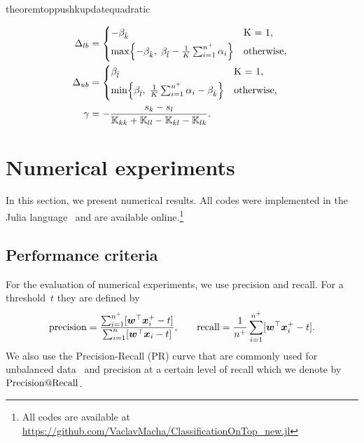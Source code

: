 \begin{restatable}{theorem}{toppushkupdatequadratic}
\begin{itemize}
    \begin{align*}
      \Delta_{lb} & = 
        \begin{cases*}
          -\beta_{\hat k} & K = 1, \\
          \max \Brac[c]{- \beta_{\hat k},\; \beta_{\hat l} - \frac{1}{K} \sum_{i = 1}^{n^+} \alpha_i} & \textrm{otherwise},
        \end{cases*} \\
      \Delta_{ub} & = 
        \begin{cases*}
          \beta_{\hat l} & K = 1, \\
          \min \Brac[c]{\beta_{\hat l},\; \frac{1}{K} \sum_{i = 1}^{n^+} \alpha_i - \beta_{\hat k}} & \textrm{otherwise},
        \end{cases*} \\
      \gamma & = -\frac{s_k - s_l}{\K_{kk} + \K_{ll} - \K_{kl} - \K_{lk}}.
    \end{align*}
  \end{itemize}
\end{restatable}

\section{Numerical experiments}\label{sec:Numerical experiments}

In this section, we present numerical results. All codes were implemented in the Julia language~\cite{bezanson2017julia} and are available online.\footnote{All codes are available at \url{https://github.com/VaclavMacha/ClassificationOnTop_new.jl}}

\subsection{Performance criteria}

For the evaluation of numerical experiments, we use precision and recall. For a threshold~$t$ they are defined by
\begin{equation}\label{eq:prec_rec}
  \begin{alignedat}{2}
      \operatorname{precision}
      & = \frac{\sum_{i = 1}^{n^+} [\bm{w}^{\top}\bm{x}^+_{i} - t]}{\sum_{i = 1}^{n} [\bm{w}^{\top}\bm{x}_{i} - t]}, & \qquad
      \operatorname{recall}
      & = \frac{1}{n^+} \sum_{i = 1}^{n^+} [\bm{w}^{\top}\bm{x}^+_{i} - t].
  \end{alignedat}
\end{equation}
We also use the Precision-Recall (PR) curve that are commonly used for unbalanced data~\cite{davis2006relationship} and precision at a certain level of recall which we denote by~$\operatorname{Precision@Recall}$.

